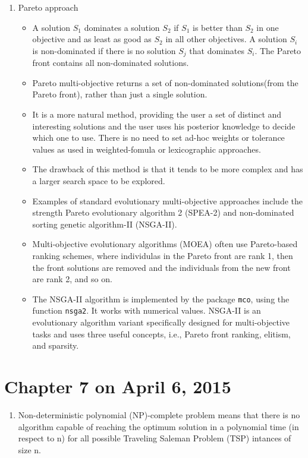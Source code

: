\documentclass[12pt, a4paper]{article}
\begin{document}
\begin{enumerate}
 \item Pareto approach
  \begin{itemize}
   \item A solution $S_1$ dominates a solution $S_2$ if $S_1$ is better than $S_2$ in one objective and as least as good as $S_2$ in all other objectives. A solution $S_i$ is non-dominated if there is no solution $S_j$ that dominates $S_i$. The Pareto front contains all non-dominated solutions.
   \item Pareto multi-objective returns a set of non-dominated solutions(from the Pareto front), rather than just a single solution.
   \item It is a more natural method, providing the user a set of distinct and interesting solutions and the user uses his posterior knowledge to decide which one to use. There is no need to set ad-hoc weights or tolerance values as used in weighted-fomula or lexicographic approaches. 
   \item The drawback of this method is that it tends to be more complex and has a larger search space to be explored.
   \item Examples of standard evolutionary multi-objective approaches include the strength Pareto evolutionary algorithm 2 (SPEA-2) and non-dominated sorting genetic algorithm-II (NSGA-II).
   \item Multi-objective evolutionary algorithms (MOEA) often use Pareto-based ranking schemes, where individulas in the Pareto front are rank 1, then the front solutions are removed and the individuals from the new front are rank 2, and so on.
   \item The NSGA-II algorithm is implemented by the package \texttt{mco}, using the function \texttt{nsga2}. It works with numerical values. NSGA-II is an evolutionary algorithm variant specifically designed for multi-objective tasks and uses three useful concepts, i.e., Pareto front ranking, elitism, and sparsity. 
  \end{itemize}
\end{enumerate}

\section{Chapter 7 on April 6, 2015}
\begin{enumerate}
 \item Non-deterministic polynomial (NP)-complete problem means that there is no algorithm capable of reaching the optimum solution in a polynomial time (in respect to n) for all possible Traveling Saleman Problem (TSP) intances of size n.
\end{enumerate}
\end{document}

